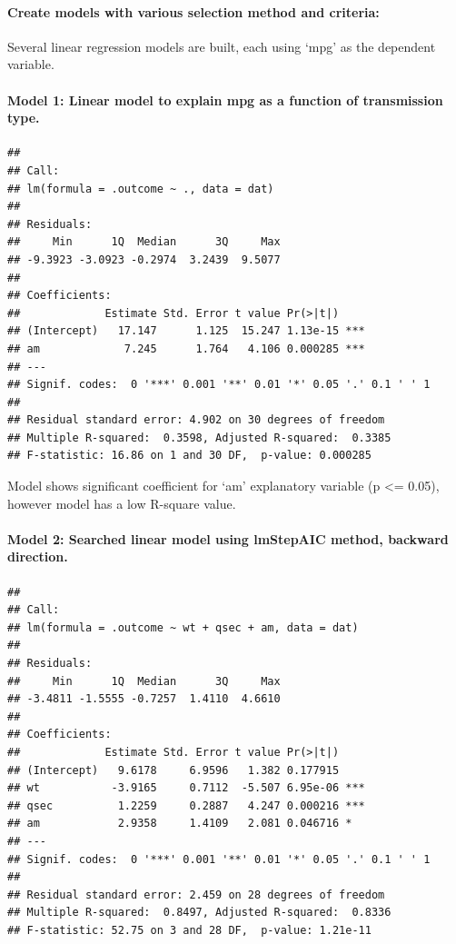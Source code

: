 \documentclass[]{article}
\begin{document}
\paragraph{Create models with various selection method and
criteria:}\label{create-models-with-various-selection-method-and-criteria}

Several linear regression models are built, each using `mpg' as the
dependent variable.

\paragraph{Model 1: Linear model to explain mpg as a function of
transmission
type.}\label{model-1-linear-model-to-explain-mpg-as-a-function-of-transmission-type.}

\begin{verbatim}
## 
## Call:
## lm(formula = .outcome ~ ., data = dat)
## 
## Residuals:
##     Min      1Q  Median      3Q     Max 
## -9.3923 -3.0923 -0.2974  3.2439  9.5077 
## 
## Coefficients:
##             Estimate Std. Error t value Pr(>|t|)    
## (Intercept)   17.147      1.125  15.247 1.13e-15 ***
## am             7.245      1.764   4.106 0.000285 ***
## ---
## Signif. codes:  0 '***' 0.001 '**' 0.01 '*' 0.05 '.' 0.1 ' ' 1
## 
## Residual standard error: 4.902 on 30 degrees of freedom
## Multiple R-squared:  0.3598, Adjusted R-squared:  0.3385 
## F-statistic: 16.86 on 1 and 30 DF,  p-value: 0.000285
\end{verbatim}

Model shows significant coefficient for `am' explanatory variable (p
\textless{}= 0.05), however model has a low R-square value.

\paragraph{Model 2: Searched linear model using lmStepAIC method,
backward
direction.}\label{model-2-searched-linear-model-using-lmstepaic-method-backward-direction.}

\begin{verbatim}
## 
## Call:
## lm(formula = .outcome ~ wt + qsec + am, data = dat)
## 
## Residuals:
##     Min      1Q  Median      3Q     Max 
## -3.4811 -1.5555 -0.7257  1.4110  4.6610 
## 
## Coefficients:
##             Estimate Std. Error t value Pr(>|t|)    
## (Intercept)   9.6178     6.9596   1.382 0.177915    
## wt           -3.9165     0.7112  -5.507 6.95e-06 ***
## qsec          1.2259     0.2887   4.247 0.000216 ***
## am            2.9358     1.4109   2.081 0.046716 *  
## ---
## Signif. codes:  0 '***' 0.001 '**' 0.01 '*' 0.05 '.' 0.1 ' ' 1
## 
## Residual standard error: 2.459 on 28 degrees of freedom
## Multiple R-squared:  0.8497, Adjusted R-squared:  0.8336 
## F-statistic: 52.75 on 3 and 28 DF,  p-value: 1.21e-11
\end{verbatim}
\end{document}
